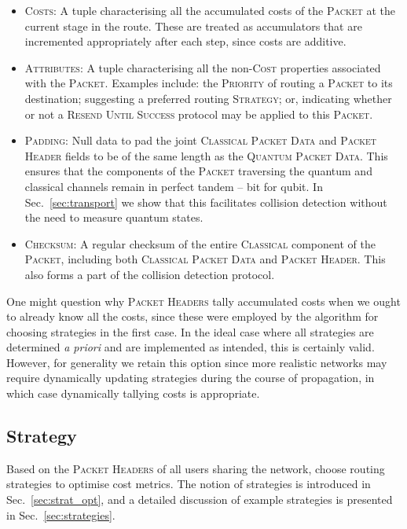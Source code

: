 \documentclass[aps, rmp, twocolumn, amsmath, amssymb, nofootinbib, superscriptaddress, longbibliography, floatfix, table-of-contents, eqsecnum]{revtex4-1}
\begin{document}
\begin{itemize}
    \item \textsc{Costs}: A tuple characterising all the accumulated costs of the \textsc{Packet} at the current stage in the route. These are treated as accumulators that are incremented appropriately after each step, since costs are additive.
    \item \textsc{Attributes}: A tuple characterising all the non-\textsc{Cost} properties associated with the \textsc{Packet}. Examples include: the \textsc{Priority} of routing a \textsc{Packet} to its destination; suggesting a preferred routing \textsc{Strategy}; or, indicating whether or not a \textsc{Resend Until Success} protocol may be applied to this \textsc{Packet}.
    \item \textsc{Padding}: Null data to pad the joint \textsc{Classical Packet Data} and \textsc{Packet Header} fields to be of the same length as the \textsc{Quantum Packet Data}. This ensures that the components of the \textsc{Packet} traversing the quantum and classical channels remain in perfect tandem -- bit for qubit. In Sec.~\ref{sec:transport} we show that this facilitates collision detection without the need to measure quantum states.
    \item \textsc{Checksum}: A regular checksum of the entire \textsc{Classical} component of the \textsc{Packet}, including both \textsc{Classical Packet Data} and \textsc{Packet Header}. This also forms a part of the collision detection protocol.
\end{itemize}

One might question why \textsc{Packet Headers} tally accumulated costs when we ought to already know all the costs, since these were employed by the algorithm for choosing strategies in the first case. In the ideal case where all strategies are determined \textit{a priori} and are implemented as intended, this is certainly valid. However, for generality we retain this option since more realistic networks may require dynamically updating strategies during the course of propagation, in which case dynamically tallying costs is appropriate.

%
%

\subsection{Strategy} \label{sec:into_strat} 

Based on the \textsc{Packet Headers} of all users sharing the network, choose routing strategies to optimise cost metrics. The notion of strategies is introduced in Sec.~\ref{sec:strat_opt}, and a detailed discussion of example strategies is presented in Sec.~\ref{sec:strategies}.
\end{document}
